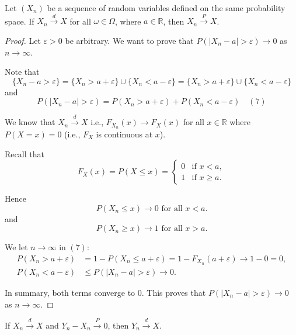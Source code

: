 \begin{theorem}
Let \( (X_n) \) be a sequence of random variables defined on the same probability space. If \( X_n \xrightarrow{d} X \) for all \( \omega \in \Omega \), where \( a \in \mathbb{R} \), then \( X_n \xrightarrow{P} X \).
\end{theorem}

\begin{proof}
Let \(\varepsilon > 0\) be arbitrary. We want to prove that \( P(|X_n - a| > \varepsilon) \rightarrow 0 \) as \( n \rightarrow \infty \).

Note that 
\[
\{X_n - a > \varepsilon\} = \{X_n > a + \varepsilon\} \cup \{X_n < a - \varepsilon\} = \{X_n > a + \varepsilon\} \cup \{X_n < a - \varepsilon\}
\]
and
\[
P(|X_n - a| > \varepsilon) = P(X_n > a + \varepsilon) + P(X_n < a - \varepsilon) \quad (7)
\]

We know that \(X_n \xrightarrow{d} X\) i.e., \(F_{X_n}(x) \rightarrow F_X(x)\) for all \(x \in \mathbb{R}\) where \(P(X=x)=0\) (i.e., \(F_X\) is continuous at \(x\)).

Recall that 
\[
F_X(x) = P(X \leq x) = \begin{cases} 
0 & \text{if } x < a, \\
1 & \text{if } x \geq a.
\end{cases}
\]

Hence 
\[
P(X_n \leq x) \rightarrow 0 \text{ for all } x < a.
\]
and 
\[
P(X_n \geq x) \rightarrow 1 \text{ for all } x > a.
\]

We let \( n \rightarrow \infty \) in \( (7) \):
\begin{align*}
P(X_n > a + \varepsilon) &= 1 - P(X_n \leq a + \varepsilon) = 1 - F_{X_n}(a + \varepsilon) \rightarrow 1 - 0 = 0, \\
P(X_n < a - \varepsilon) &\leq P(|X_n - a| > \varepsilon) \rightarrow 0.
\end{align*}

In summary, both terms converge to 0. This proves that \( P(|X_n - a| > \varepsilon) \rightarrow 0 \) as \( n \rightarrow \infty \).
\end{proof}


\begin{theorem}
If \( X_n \xrightarrow{d} X \) and \( Y_n - X_n \xrightarrow{P} 0 \), then \( Y_n \xrightarrow{d} X \).
\end{theorem}

